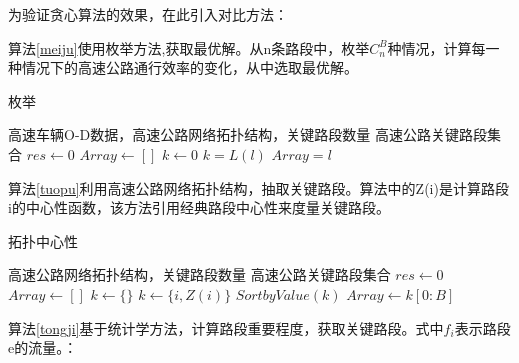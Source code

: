    	为验证贪心算法的效果，在此引入对比方法：

    	算法\ref{meiju}使用枚举方法,获取最优解。从n条路段中，枚举$C_n^B$种情况，计算每一种情况下的高速公路通行效率的变化，从中选取最优解。

    	\begin{algorithm}[!h]
        \caption{枚举} 
        \label{meiju} 
        \begin{algorithmic}[1] %
            \Require 高速车辆O-D数据，高速公路网络拓扑结构，关键路段数量
            \Ensure 高速公路关键路段集合
                \State $res\gets 0$  
                \State $Array\gets []$  
                \State $k\gets 0$ 
                        	\State $k=L(l)$  
                        	\State $Array=l$  
                    	\EndIf
                	\EndFor  
                \State {}  
            \EndFunction  
        \end{algorithmic}  
    	\end{algorithm} 

    	算法\ref{tuopu}利用高速公路网络拓扑结构，抽取关键路段。算法中的Z(i)是计算路段i的中心性函数，该方法引用经典路段中心性来度量关键路段。

    	\begin{algorithm}[!h]
        \caption{拓扑中心性}  
        \label{tuopu}
        \begin{algorithmic}[1] %
            \Require 高速公路网络拓扑结构，关键路段数量
            \Ensure 高速公路关键路段集合
                \State $res\gets 0$  
                \State $Array\gets []$  
                \State $k\gets \{\}$ 
                		\State $k\gets \{i,Z(i)\}$ 
                	\EndFor  
                \State $SortbyValue(k)$
                \State $Array\gets k[0:B]$
                \State {}  
            \EndFunction  
        \end{algorithmic}  
    	\end{algorithm} 

    	算法\ref{tongji}基于统计学方法，计算路段重要程度，获取关键路段。式中$f_i$表示路段e的流量。：

